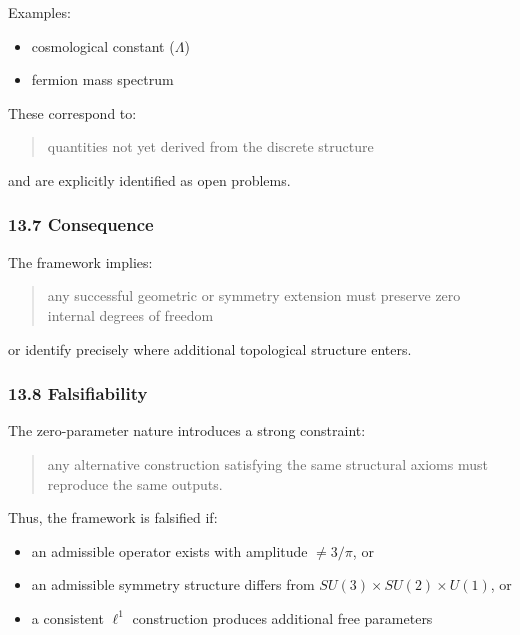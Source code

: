 \documentclass[
]{article}
\providecommand{\tightlist}{%
  \setlength{\itemsep}{0pt}\setlength{\parskip}{0pt}}
\begin{document}
Examples:

\begin{itemize}
\tightlist
\item
  cosmological constant (\(\Lambda\))
\item
  fermion mass spectrum
\end{itemize}

These correspond to:

\begin{quote}
quantities not yet derived from the discrete structure
\end{quote}

and are explicitly identified as open problems.

\subsubsection{13.7 Consequence}\label{consequence}

The framework implies:

\begin{quote}
any successful geometric or symmetry extension must preserve zero
internal degrees of freedom
\end{quote}

or identify precisely where additional topological structure enters.

\subsubsection{13.8 Falsifiability}\label{falsifiability}

The zero-parameter nature introduces a strong constraint:

\begin{quote}
any alternative construction satisfying the same structural axioms must
reproduce the same outputs.
\end{quote}

Thus, the framework is falsified if:

\begin{itemize}
\tightlist
\item
  an admissible operator exists with amplitude \(\neq 3/\pi\), or
\item
  an admissible symmetry structure differs from
  \(SU(3) \times SU(2) \times U(1)\), or
\item
  a consistent \(\ell^1\) construction produces additional free
  parameters
\end{itemize}
\end{document}
